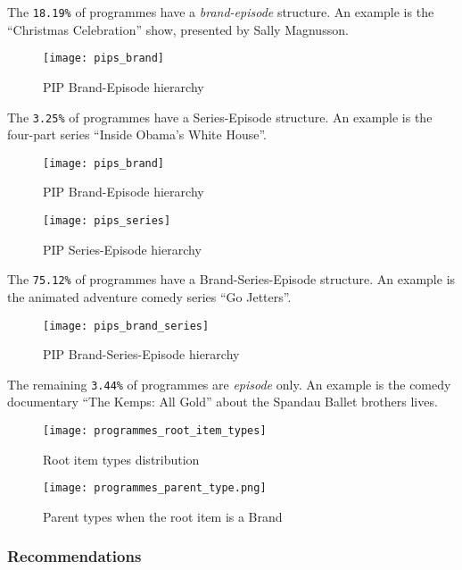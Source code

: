 The \verb|18.19%| of programmes have a \textit{brand-episode} structure.
An example is the ``Christmas Celebration'' show, presented by Sally Magnusson.

\begin{figure}[H]
  \centering
  \texttt{[image: pips\_brand]}
  \caption{PIP Brand-Episode hierarchy}
  \label{fig:pips_brand}
\end{figure}

The \verb|3.25%| of programmes have a Series-Episode structure.
An example is the four-part series ``Inside Obama's White House''.

\begin{figure}[H]
  \centering
  \texttt{[image: pips\_brand]}
  \caption{PIP Brand-Episode hierarchy}
  \label{fig:pips_brand}
\end{figure}

\begin{figure}[H]
  \centering
  \texttt{[image: pips\_series]}
  \caption{PIP Series-Episode hierarchy}
  \label{fig:pips_series}
\end{figure}

The \verb|75.12%| of programmes have a Brand-Series-Episode structure.
An example is the animated adventure comedy series ``Go Jetters''.

\begin{figure}[H]
  \centering
  \texttt{[image: pips\_brand\_series]}
  \caption{PIP Brand-Series-Episode hierarchy}
  \label{fig:pips_brand_series}
\end{figure}

The remaining \verb|3.44%| of programmes are \textit{episode} only.
An example is the comedy documentary ``The Kemps: All Gold'' about the Spandau Ballet brothers lives.

\begin{figure}[H]
  \centering
  \texttt{[image: programmes\_root\_item\_types]}
  \caption{Root item types distribution}
  \label{fig:programmes_root_item_types}
\end{figure}

\begin{figure}[H]
  \centering
  \texttt{[image: programmes\_parent\_type.png]}
  \caption{Parent types when the root item is a Brand}
  \label{fig:programmes_parent_type}
\end{figure}

\subsubsection{Recommendations}

